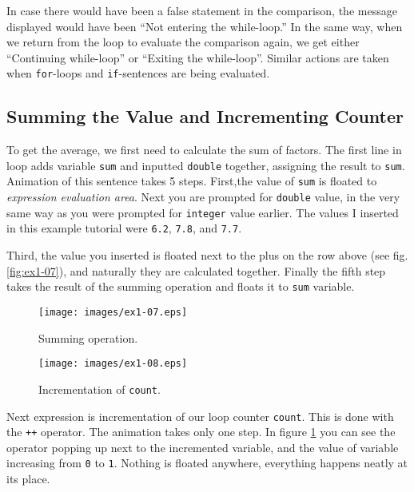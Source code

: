 \documentclass[a4paper,12pt,english]{article}
\newcommand{\p}[1]{\texttt{#1}}
\begin{document}
In case there would have been a false statement in the comparison, the message displayed would have been ``Not entering the while-loop.'' In the same way, when we return from the loop to evaluate the comparison again, we get either ``Continuing while-loop'' or ``Exiting the while-loop''. Similar actions are taken when \p{for}-loops and \p{if}-sentences are being evaluated.

\subsection{Summing the Value and Incrementing Counter}

To get the average, we first need to calculate the sum of factors. The first line in loop adds variable \p{sum} and inputted \p{double} together, assigning the result to \p{sum}. Animation of this sentence takes 5 steps. First,the value of \p{sum} is floated to \emph{expression evaluation area}. Next you are prompted for \p{double} value, in the very same way as you were prompted for \p{integer} value earlier. The values I inserted in this example tutorial were \p{6.2}, \p{7.8}, and \p{7.7}.

Third, the value you inserted is floated next to the plus on the row above (see fig. \ref{fig:ex1-07}), and naturally they are calculated together. Finally the fifth step takes the result of the summing operation and floats it to \p{sum} variable.

\begin{figure}[ht]
  \begin{minipage}[t]{.49\textwidth}
    \begin{center}  
      \texttt{[image: images/ex1-07.eps]}
      \caption{\label{fig:ex1-07}Summing operation.}
    \end{center}
  \end{minipage}
  \hfill
  \begin{minipage}[t]{.49\textwidth}
    \begin{center}  
      \texttt{[image: images/ex1-08.eps]}
      \caption{\label{fig:ex1-08}Incrementation of \p{count}.}
    \end{center}
  \end{minipage}
\end{figure}

Next expression is incrementation of our loop counter \p{count}. This is done with the \p{++} operator. The animation takes only one step. In figure \ref{fig:ex1-08} you can see the operator popping up next to the incremented variable, and the value of variable increasing from \p{0} to \p{1}. Nothing is floated anywhere, everything happens neatly at its place.
\end{document}

